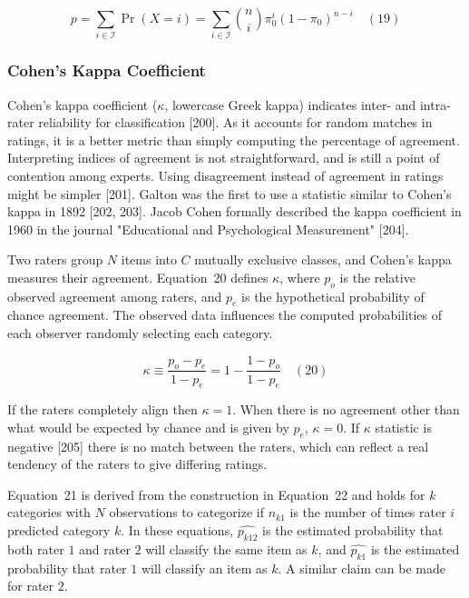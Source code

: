 \documentclass[sn-mathphys-num]{sn-jnl}%
\begin{document}
\begin{equation}
	p=\sum_{i\in {\mathcal{I}}}\Pr(X=i)=\sum_{i\in {\mathcal{I}}}{\binom{n}{i}}\pi_{0}^{i}(1-\pi_{0})^{n-i}
	\quad\left(19\right)
\end{equation}

\subsubsection{Cohen's Kappa Coefficient}

Cohen's kappa coefficient ($\kappa$, lowercase Greek kappa) indicates inter- and intra-rater reliability for classification [200]. As it accounts for random matches in ratings, it is a better metric than simply computing the percentage of agreement. Interpreting indices of agreement is not straightforward, and is still a point of contention among experts. Using disagreement instead of agreement in ratings might be simpler [201]. Galton was the first to use a statistic similar to Cohen's kappa in 1892 [202, 203]. Jacob Cohen formally described the kappa coefficient in 1960 in the journal "Educational and Psychological Measurement" [204].

Two raters group $N$ items into $C$ mutually exclusive classes, and Cohen's kappa measures their agreement. Equation~20 defines $\kappa$, where $p_{o}$ is the relative observed agreement among raters, and $p_{e}$ is the hypothetical probability of chance agreement. The observed data influences the computed probabilities of each observer randomly selecting each category.

\begin{equation}
	\kappa \equiv {\frac {p_{o}-p_{e}}{1-p_{e}}}=1-{\frac {1-p_{o}}{1-p_{e}}}
	\quad\left(20\right)
\end{equation}

If the raters completely align then $\kappa = 1$. When there is no agreement other than what would be expected by chance and is given by $p_{e}$, $\kappa = 0$. If $\kappa$ statistic is negative [205] there is no match between the raters, which can reflect a real tendency of the raters to give differing ratings.

Equation~21 is derived from the construction in Equation~22 and holds for $k$ categories with $N$ observations to categorize if $n_{k1}$ is the number of times rater $i$ predicted category $k$. In these equations, ${\widehat{p_{k12}}}$ is the estimated probability that both rater $1$ and rater $2$ will classify the same item as $k$, and ${\widehat {p_{k1}}}$ is the estimated probability that rater $1$ will classify an item as $k$. A similar claim can be made for rater $2$.
\end{document}
